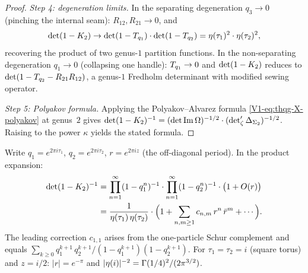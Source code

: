 \begin{proof}
\emph{Step 4: degeneration limits.}
In the separating degeneration $q_3 \to 0$
(pinching the internal seam):
$R_{12}, R_{21} \to 0$, and
\[
\det(1 - K_2) \to
\det(1 - T_{q_1}) \cdot \det(1 - T_{q_2})
= \eta(\tau_1)^2 \cdot \eta(\tau_2)^2,
\]
recovering the product of two genus-$1$ partition functions.
In the non-separating degeneration $q_1 \to 0$
(collapsing one handle):
$T_{q_1} \to 0$ and $\det(1 - K_2)$ reduces to
$\det(1 - T_{q_2} - R_{21}R_{12})$, a genus-$1$
Fredholm determinant with modified sewing operator.

\emph{Step 5: Polyakov formula.}
Applying the Polyakov--Alvarez formula
\eqref{V1-eq:thqg-X-polyakov} at genus~$2$ gives
$\det(1 - K_2)^{-1}
= (\det\operatorname{Im}\Omega)^{-1/2}
\cdot (\det\nolimits'_\zeta\Delta_{\Sigma_2})^{-1/2}$.
Raising to the power $\kappa$ yields the stated formula.
\end{proof}

\begin{computation}%
%
Write $q_1 = e^{2\pi i \tau_1}$, $q_2 = e^{2\pi i \tau_2}$,
$r = e^{2\pi i z}$ (the off-diagonal period).
In the product expansion:
\begin{align}
\det(1 - K_2)^{-1}
&= \prod_{n=1}^{\infty}(1-q_1^n)^{-1}
\cdot \prod_{n=1}^{\infty}(1-q_2^n)^{-1}
\cdot \bigl(1 + O(r)\bigr)
\notag\\
&= \frac{1}{\eta(\tau_1)\,\eta(\tau_2)}
\cdot \Bigl(1 + \sum_{n,m \geq 1}
c_{n,m}\,r^n\,\bar{r}^m + \cdots\Bigr).
\end{align}
The leading correction $c_{1,1}$ arises from the one-particle
Schur complement and equals
$\sum_{k \geq 0} q_1^{k+1}\,q_2^{k+1}/(1-q_1^{k+1})(1-q_2^{k+1})$.
For $\tau_1 = \tau_2 = i$ (square torus) and $z = i/2$:
$|r| = e^{-\pi}$ and $|\eta(i)|^{-2} = \Gamma(1/4)^2/(2\pi^{3/2})$.
\end{computation}


